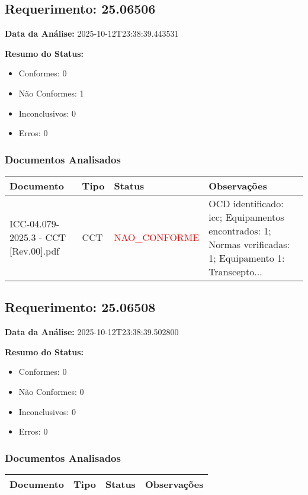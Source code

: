 \documentclass[12pt,a4paper]{article}
\begin{document}
\subsection{Requerimento: 25.06506}

\textbf{Data da Análise:} 2025-10-12T23:38:39.443531

\textbf{Resumo do Status:}
\begin{itemize}
    \item Conformes: 0
    \item Não Conformes: 1
    \item Inconclusivos: 0
    \item Erros: 0
\end{itemize}

\subsubsection{Documentos Analisados}

\begin{longtable}{|p{4cm}|p{2cm}|p{2cm}|p{6cm}|}
\hline
\textbf{Documento} & \textbf{Tipo} & \textbf{Status} & \textbf{Observações} \\
\hline
\endhead
ICC-04.079-2025.3 - CCT [Rev.00].pdf & CCT & \textcolor{red}{NAO\_CONFORME} & OCD identificado: icc; Equipamentos encontrados: 1; Normas verificadas: 1; Equipamento 1: Transcepto... \\
\hline
\end{longtable}


\subsection{Requerimento: 25.06508}

\textbf{Data da Análise:} 2025-10-12T23:38:39.502800

\textbf{Resumo do Status:}
\begin{itemize}
    \item Conformes: 0
    \item Não Conformes: 0
    \item Inconclusivos: 0
    \item Erros: 0
\end{itemize}

\subsubsection{Documentos Analisados}

\begin{longtable}{|p{4cm}|p{2cm}|p{2cm}|p{6cm}|}
\hline
\textbf{Documento} & \textbf{Tipo} & \textbf{Status} & \textbf{Observações} \\
\hline
\endhead
\end{longtable}
\end{document}
